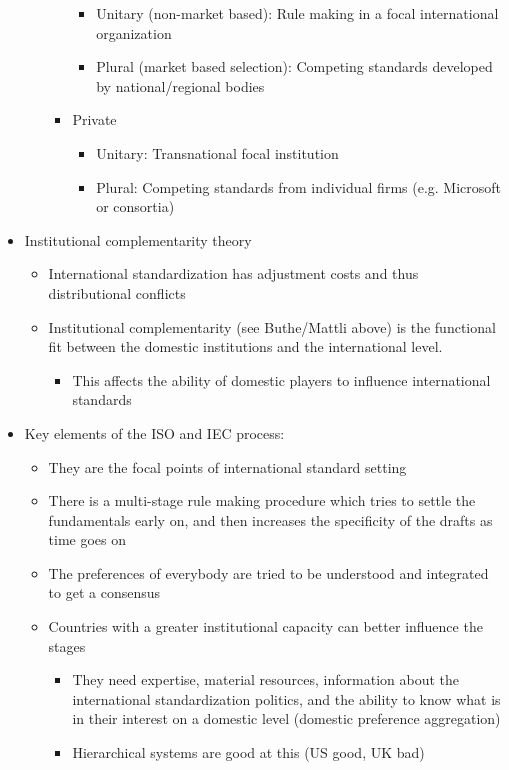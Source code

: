 \documentclass[11pt]{article}
\begin{document}
\begin{itemize}
\begin{itemize}
\begin{itemize}
\begin{itemize}
\item Unitary (non-market based): Rule making in a focal international organization
\item Plural (market based selection): Competing standards developed by
national/regional bodies
\end{itemize}
\item Private
\begin{itemize}
\item Unitary: Transnational focal institution
\item Plural: Competing standards from individual firms (e.g. Microsoft or
consortia)
\end{itemize}
\end{itemize}
\end{itemize}
\item Institutional complementarity theory
\begin{itemize}
\item International standardization has adjustment costs and thus distributional
conflicts
\item Institutional complementarity (see Buthe/Mattli above) is the functional fit
between the domestic institutions and the international level.
\begin{itemize}
\item This affects the ability of domestic players to influence international standards
\end{itemize}
\end{itemize}
\item Key elements of the ISO and IEC process:
\begin{itemize}
\item They are the focal points of international standard setting
\item There is a multi-stage rule making procedure which tries to settle the
fundamentals early on, and then increases the specificity of the drafts as
time goes on
\item The preferences of everybody are tried to be understood and integrated to
get a consensus
\item Countries with a greater institutional capacity can better influence the stages
\begin{itemize}
\item They need expertise, material resources, information about the
international standardization politics, and the ability to know what is in
their interest on a domestic level (domestic preference aggregation)
\item Hierarchical systems are good at this (US good, UK bad)
\end{itemize}
\end{itemize}
\end{itemize}
\end{document}
